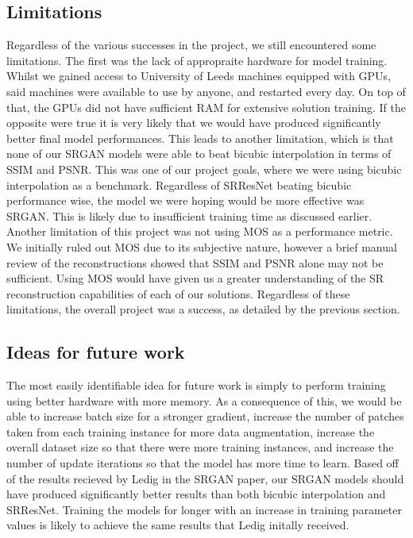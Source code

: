 \subsection{Limitations}
Regardless of the various successes in the project, we still encountered some limitations. The first was the lack of appropraite hardware for model training. Whilst we gained access to University of Leeds machines equipped with GPUs, said machines were available to use by anyone, and restarted every day. On top of that, the GPUs did not have sufficient RAM for extensive solution training. If the opposite were true it is very likely that we would have produced significantly better final model performances. This leads to another limitation, which is that none of our SRGAN models were able to beat bicubic interpolation in terms of SSIM and PSNR. This was one of our project goals, where we were using bicubic interpolation as a benchmark. Regardless of SRResNet beating bicubic performance wise, the model we were hoping would be more effective was SRGAN. This is likely due to insufficient training time as discussed earlier. Another limitation of this project was not using MOS as a performance metric. We initially ruled out MOS due to its subjective nature, however a brief manual review of the reconstructions showed that SSIM and PSNR alone may not be sufficient. Using MOS would have given us a greater understanding of the SR reconstruction capabilities of each of our solutions. Regardless of these limitations, the overall project was a success, as detailed by the previous section.

\subsection{Ideas for future work}
The most easily identifiable idea for future work is simply to perform training using better hardware with more memory. As a consequence of this, we would be able to increase batch size for a stronger gradient, increase the number of patches taken from each training instance for more data augmentation, increase the overall dataset size so that there were more training instances, and increase the number of update iterations so that the model has more time to learn. Based off of the results recieved by Ledig \etal in the SRGAN paper, our SRGAN models should have produced significantly better results than both bicubic interpolation and SRResNet. Training the models for longer with an increase in training parameter values is likely to achieve the same results that Ledig \etal initally received.  

